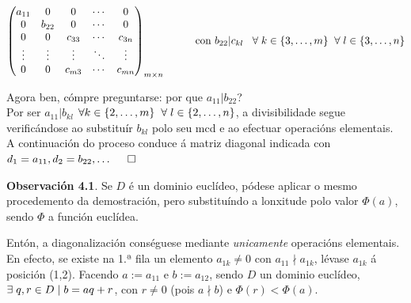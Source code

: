 \documentclass[twoside]{report}
\theoremstyle{mystyle}
\begin{document}
$$
\begin{pmatrix}
a_{11} & 0 & 0 & \cdots & 0\\
0 & b_{22} & 0 & \cdots & 0 \\
0 & 0 & c_{33} & \cdots & c_{3n}\\
\vdots & \vdots & \vdots & \ddots & \vdots \\
0 & 0 & c_{m3} & \cdots & c_{mn} 
\end{pmatrix}_{m \times n}
\hspace{10mm}
\text{con } b_{22} | c_{kl} \hspace{3mm} \forall \hspace{1mm} k \in \{3, \dots, m\} \hspace{2mm} \forall \hspace{1mm} l \in \{3, \dots, n\} 
$$

\vspace{3mm}

\noindent Agora ben, cómpre preguntarse: por que $a_{11} | b_{22}$?\\

\noindent Por ser $a_{11} | b_{kl}$ \hspace{2mm} $\forall k \in \{2, \dots, m\} \hspace{2mm} \forall \hspace{1mm} l \in \{2, \dots, n\}$, a divisibilidade segue verificándose ao substituír $b_{kl}$ polo seu mcd e ao efectuar operacións elementais.\\

\noindent A continuación do proceso conduce á matriz diagonal indicada con $d_{1} = a_{11}, d_{2} = b_{22}, \dots \hspace{5mm} \square$\\

\vspace{2mm}

\noindent \textbf{Observación 4.1}. Se $D$ é un dominio euclídeo, pódese aplicar o mesmo procedemento da demostración, pero substituíndo a lonxitude polo valor $\Phi(a)$, sendo $\Phi$ a función euclídea.\par
\noindent Entón, a diagonalización conséguese mediante \textit{unicamente} operacións elementais.\\

\noindent En efecto, se existe na 1.ª fila un elemento $a_{1k} \neq 0$ con $a_{11} \nmid a_{1k}$, lévase $a_{1k}$ á posición (1,2). Facendo $a := a_{11}$ e $b := a_{12}$, sendo $D$ un dominio euclídeo, $\exists \hspace{1mm} q,r \in D \hspace{1mm} | \hspace{1mm} b = aq +r$, con $r \neq 0$ (pois $a \nmid b$) e $\Phi(r) < \Phi(a)$.\\
\end{document}
